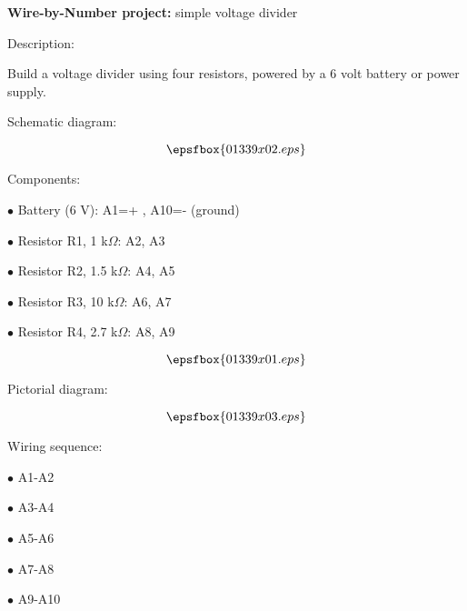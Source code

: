 

\centerline{{\bf Wire-by-Number project:} simple voltage divider} \bigskip 

\noindent Description:

Build a voltage divider using four resistors, powered by a 6 volt battery or power supply.

\vskip 10pt

\goodbreak

\noindent Schematic diagram: 

$$\epsfbox{01339x02.eps}$$

\vskip 10pt

\goodbreak

\noindent Components:

\medskip
\item{$\bullet$} Battery (6 V): A1=+ , A10=- (ground)
\item{$\bullet$} Resistor R1, 1 k$\Omega$: A2, A3
\item{$\bullet$} Resistor R2, 1.5 k$\Omega$: A4, A5
\item{$\bullet$} Resistor R3, 10 k$\Omega$: A6, A7
\item{$\bullet$} Resistor R4, 2.7 k$\Omega$: A8, A9
\medskip

$$\epsfbox{01339x01.eps}$$

\vskip 10pt

\goodbreak

\noindent Pictorial diagram:

$$\epsfbox{01339x03.eps}$$

\vskip 10pt

\goodbreak

\noindent Wiring sequence:

\medskip
\item{$\bullet$} A1-A2
\item{$\bullet$} A3-A4
\item{$\bullet$} A5-A6
\item{$\bullet$} A7-A8
\item{$\bullet$} A9-A10
\medskip

